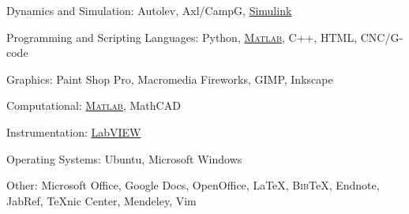 \documentclass[10pt]{article}
\newcommand{\blankline}{\quad\pagebreak[2]}
\begin{document}
\blankline

Dynamics and Simulation: Autolev, Axl/CampG, \href{http://www.mathworks.com/products/simulink/}{Simulink}

\blankline

Programming and Scripting Languages: Python,
\href{http://www.mathworks.com/products/matlab/}{\textsc{Matlab}}, C++, HTML, CNC/G-code

\blankline


Graphics: Paint Shop Pro, Macromedia Fireworks, GIMP, Inkscape

\blankline


Computational: \href{http://www.mathworks.com/products/matlab/}{\textsc{Matlab}}, MathCAD

\blankline

Instrumentation: \href{http://www.ni.com/}{LabVIEW}

\blankline

Operating Systems: Ubuntu, Microsoft Windows

\blankline

Other: Microsoft Office, Google Docs, OpenOffice, \LaTeX{}, B\textsc{ib}\TeX{},
Endnote, JabRef, TeXnic Center, Mendeley, Vim
\end{document}
